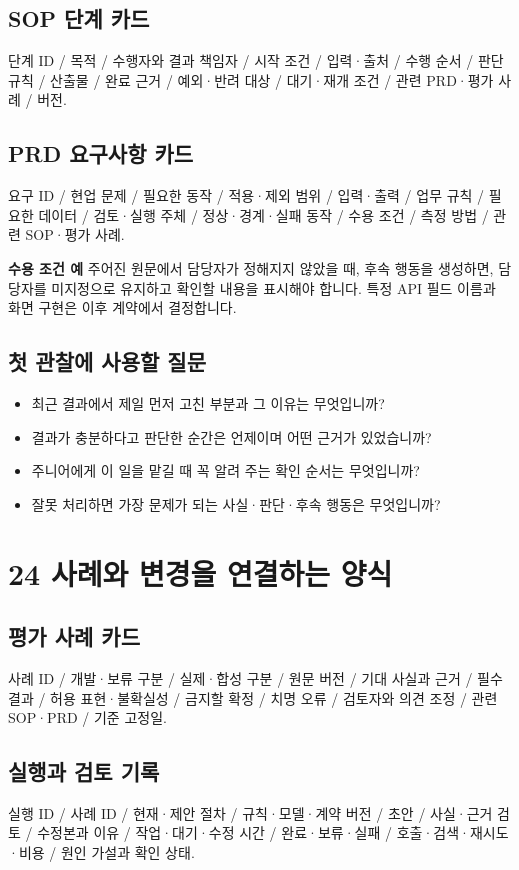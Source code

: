 \documentclass[a4paper,10pt]{article}
\begin{document}
\subsection*{SOP 단계 카드}
단계 ID / 목적 / 수행자와 결과 책임자 / 시작 조건 / 입력·출처 / 수행 순서 / 판단 규칙 / 산출물 / 완료 근거 / 예외·반려 대상 / 대기·재개 조건 / 관련 PRD·평가 사례 / 버전.


\subsection*{PRD 요구사항 카드}
요구 ID / 현업 문제 / 필요한 동작 / 적용·제외 범위 / 입력·출력 / 업무 규칙 / 필요한 데이터 / 검토·실행 주체 / 정상·경계·실패 동작 / 수용 조건 / 측정 방법 / 관련 SOP·평가 사례.


\noindent\textbf{수용 조건 예} 주어진 원문에서 담당자가 정해지지 않았을 때, 후속 행동을 생성하면, 담당자를 미지정으로 유지하고 확인할 내용을 표시해야 합니다. 특정 API 필드 이름과 화면 구현은 이후 계약에서 결정합니다.


\subsection*{첫 관찰에 사용할 질문}
\begin{itemize}
\item 최근 결과에서 제일 먼저 고친 부분과 그 이유는 무엇입니까?
\item 결과가 충분하다고 판단한 순간은 언제이며 어떤 근거가 있었습니까?
\item 주니어에게 이 일을 맡길 때 꼭 알려 주는 확인 순서는 무엇입니까?
\item 잘못 처리하면 가장 문제가 되는 사실·판단·후속 행동은 무엇입니까?
\end{itemize}
\clearpage
\section*{24 사례와 변경을 연결하는 양식}
\subsection*{평가 사례 카드}
사례 ID / 개발·보류 구분 / 실제·합성 구분 / 원문 버전 / 기대 사실과 근거 / 필수 결과 / 허용 표현·불확실성 / 금지할 확정 / 치명 오류 / 검토자와 의견 조정 / 관련 SOP·PRD / 기준 고정일.


\subsection*{실행과 검토 기록}
실행 ID / 사례 ID / 현재·제안 절차 / 규칙·모델·계약 버전 / 초안 / 사실·근거 검토 / 수정본과 이유 / 작업·대기·수정 시간 / 완료·보류·실패 / 호출·검색·재시도·비용 / 원인 가설과 확인 상태.
\end{document}
